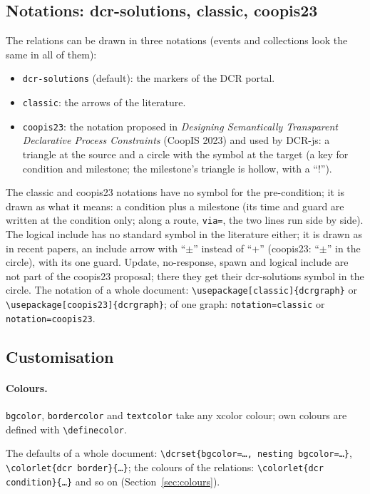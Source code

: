 \documentclass[a4paper,11pt]{article}
\newcommand\example[1]{%
  \begin{tcolorbox}[colback=white, colframe=black!25, boxrule=0.4pt,
      arc=1mm, left=2mm, right=2mm, halign lower=flush center]
    
    \tcblower
    
  \end{tcolorbox}}
\newcommand\cs[1]{\texttt{\textbackslash#1}}
\newcommand\key[1]{\texttt{#1}}
\begin{document}
\subsection{Notations: dcr-solutions, classic, coopis23}
The relations can be drawn in three notations (events and collections look
the same in all of them):
\begin{itemize}
  \item \texttt{dcr-solutions} (default): the markers of the DCR portal.
  \item \texttt{classic}: the arrows of the literature.
  \item \texttt{coopis23}: the notation proposed in \emph{Designing
    Semantically Transparent Declarative Process Constraints} (CoopIS 2023)
    and used by DCR-js: a triangle at the source and a circle with the symbol
    at the target (a key for condition and milestone; the milestone's
    triangle is hollow, with a ``!'').
\end{itemize}
\example{notation}
The classic and coopis23 notations have no symbol for the pre-condition;
it is drawn as what it means: a condition plus a milestone (its time and
guard are written at the condition only; along a route, \key{via=}, the two
lines run side by side). The logical include has no standard symbol in the
literature either; it is drawn as in recent papers, an include arrow with
``$\pm$'' instead of ``+'' (coopis23: ``$\pm$'' in the circle), with its one
guard. Update, no-response, spawn and logical include are not part of the
coopis23 proposal; there they get their dcr-solutions symbol in the circle. The notation of a whole document:
\cs{usepackage[classic]\{dcrgraph\}} or \cs{usepackage[coopis23]\{dcrgraph\}};
of one graph: \key{notation=classic} or \key{notation=coopis23}.

\subsection{Customisation}
\paragraph{Colours.} \key{bgcolor}, \key{bordercolor} and \key{textcolor} take
any \textsf{xcolor} colour; own colours are defined with \cs{definecolor}.
\example{colours}
The defaults of a whole document: \cs{dcrset\{bgcolor=\dots, nesting
bgcolor=\dots\}}, \cs{colorlet\{dcr border\}\{\dots\}}; the colours of the
relations: \cs{colorlet\{dcr condition\}\{\dots\}} and so on
(Section~\ref{sec:colours}).
\end{document}
